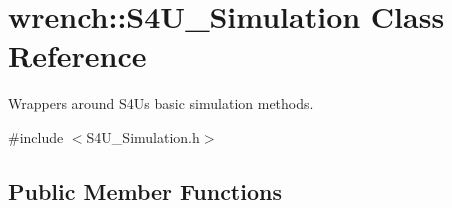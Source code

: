 \hypertarget{classwrench_1_1_s4_u___simulation}{}\section{wrench\+:\+:S4\+U\+\_\+\+Simulation Class Reference}
\label{classwrench_1_1_s4_u___simulation}


Wrappers around S4U\textquotesingle{}s basic simulation methods.  




{\ttfamily \#include $<$S4\+U\+\_\+\+Simulation.\+h$>$}

\subsection*{Public Member Functions}
